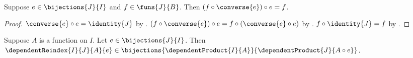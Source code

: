 \begin{theorem}\label{bijective_reverse_reindex_round_trip}
    Suppose $e\in\bijections{J}{I}$ and $f\in\funs{J}{B}$.
    Then $(f\circ\converse{e})\circ e=f$.
\end{theorem}
\begin{proof}
    $\converse{e}\circ e=\identity{J}$ by
        .
    $(f\circ\converse{e})\circ e
        =f\circ(\converse{e}\circ e)$ by .
    $f\circ\identity{J}=f$ by .
\end{proof}

\begin{theorem}\label{dependent_reindex_bijection}
    Suppose $A$ is a function on $I$.
    Let $e\in\bijections{J}{I}$.
    Then
        $\dependentReindex{I}{J}{A}{e}\in
            \bijections{\dependentProduct{I}{A}}{
                \dependentProduct{J}{A\circ e}}$.
\end{theorem}
